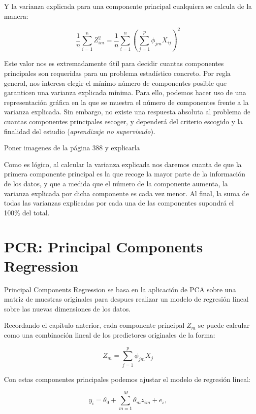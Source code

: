 \documentclass[12pt,a4paper,Spanish]{book}
\begin{document}
Y la varianza explicada para una componente principal cualquiera se calcula de la manera:

\begin{equation}
\dfrac{1}{n}\sum_{i=1}^{n}Z_{im}^2 = \dfrac{1}{n}\sum_{i=1}^{n}\left(\sum_{j=1}^{p}\phi_{jm}X_{ij}\right)^2
\end{equation}

Este valor nos es extremadamente útil para decidir cuantas componentes principales son requeridas para un problema estadístico concreto. Por regla general, nos interesa elegir el mínimo número de componentes posible que garanticen una varianza explicada mínima. Para ello, podemos hacer uso de una representación gráfica en la que se muestra el número de componentes frente a la varianza explicada. Sin embargo, no existe una respuesta absoluta al problema de cuantas componentes principales escoger, y dependerá del criterio escogido y la finalidad del estudio (\textit{aprendizaje no supervisado}).

Poner imagenes de la página 388 y explicarla

Como es lógico, al calcular la varianza explicada nos daremos cuanta de que la primera componente principal es la que recoge la mayor parte de la información de los datos, y que a medida que el número de la componente aumenta, la varianza explicada por dicha componente es cada vez menor. Al final, la suma de todas las varianzas explicadas por cada una de las componentes supondrá el 100\% del total.

\chapter{PCR: Principal Components Regression}

Principal Components Regression se basa en la aplicación de PCA sobre una matriz de muestras originales para despues realizar un modelo de regresión lineal sobre las nuevas dimensiones de los datos.

Recordando el capítulo anterior, cada componente principal $Z_m$ se puede calcular como una combinación lineal de los predictores originales de la forma:

\begin{equation}
Z_m=\sum_{j=1}^{p}\phi_{jm}X_{j}
\end{equation}

Con estas componentes principales podemos ajustar el modelo de regresión lineal:

\begin{equation}
y_i = \theta_0+\sum_{m=1}^{M}\theta_mz_{im}+e_i,      
\end{equation}
\end{document}
